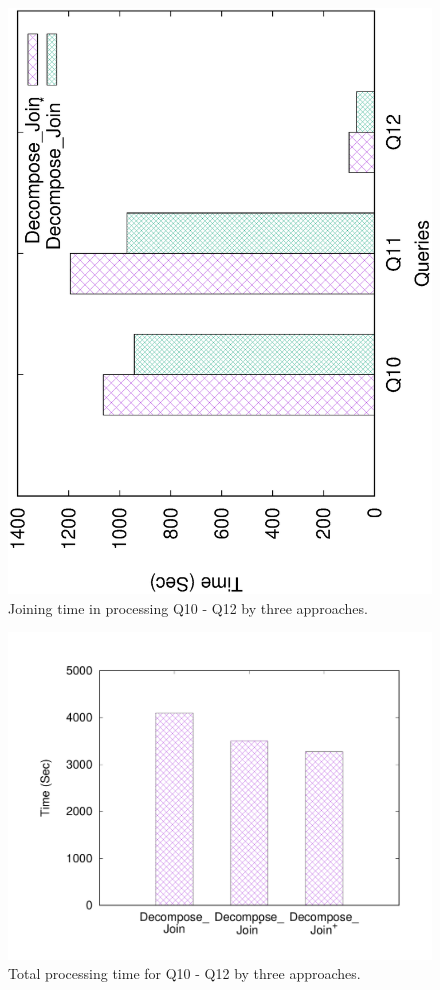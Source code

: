 \begin{figure}[H]
	\centering
	\includegraphics[scale=0.43, angle=270]{plot/threejoin.eps}
	\caption{Joining time in processing Q10 - Q12 by three approaches.}
	\label{fig:threejoin}
\end{figure}
\begin{figure}[H]
	\centering
	\includegraphics[scale=0.42]{plot/threetotal.pdf}
	\caption{Total processing time for Q10 - Q12 by three approaches.}
	\label{fig:threetotal}
\end{figure}

